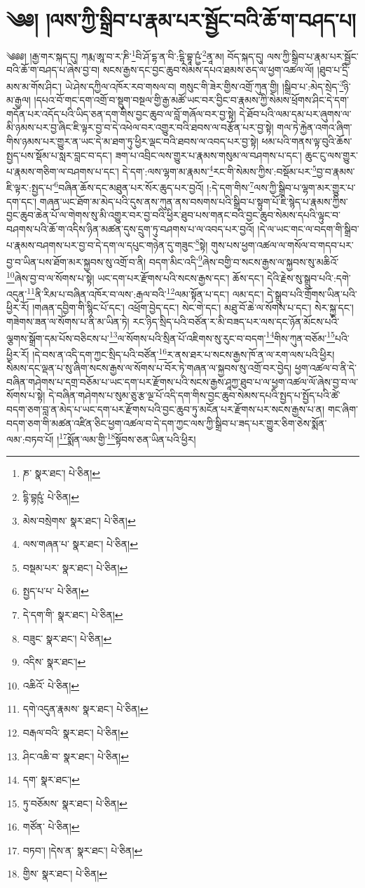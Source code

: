 \setcounter{footnote}{0} 
\chapter{༄༅། །ལས་ཀྱི་སྒྲིབ་པ་རྣམ་པར་སྦྱོང་བའི་ཆོ་ག་བཤད་པ།}༄༅༅། །རྒྱ་གར་སྐད་དུ། ཀརྨ་ཨཱ་བ་ར་ཎི་\footnote{ཎ་  སྣར་ཐང་།  པེ་ཅིན། }བི་ཤོ་དྷ་ན་བི་:དྷི་བྷཱ་ཥྱཾ་\footnote{དྷི་བྷཥུཾ་  པེ་ཅིན། }ནཱ་མ། བོད་སྐད་དུ། ལས་ཀྱི་སྒྲིབ་པ་རྣམ་པར་སྦྱོང་བའི་ཆོ་ག་བཤད་པ་ཞེས་བྱ་བ། སངས་རྒྱས་དང་བྱང་ཆུབ་སེམས་དཔའ་ཐམས་ཅད་ལ་ཕྱག་འཚལ་ལོ། །ཐུབ་པ་དྲི་མས་མ་གོས་ཤིང་། ཡེ་ཤེས་དཀྱིལ་འཁོར་རབ་གསལ་བ། གསུང་གི་ཟེར་གྱིས་འགྲོ་ཀུན་གྱི། །སྒྲིབ་པ་:མེད་སྲེད་\footnote{མེས་བསྲེགས་  སྣར་ཐང་།  པེ་ཅིན། }ཉི་མ་རྒྱལ། །དཔའ་བོ་གང་དག་འགྲོ་བ་སྡུག་བསྔལ་གྱི་རྒྱ་མཚོ་ཡང་བར་བྱིང་བ་རྣམས་ཀྱི་སེམས་ཕྲོགས་ཤིང་དེ་དག་གདོན་པར་འདོད་པའི་ཡིད་ཅན་དག་གིས་བྱང་ཆུབ་ལ་བློ་གཞོལ་བར་བྱ་སྟེ། དེ་ཐོབ་པའི་ལམ་དམ་པར་ཞུགས་ལ་མི་ཉམས་པར་བྱ་ཞིང་ཇི་ལྟར་བྱ་བ་དེ་འཕེལ་བར་འགྱུར་བའི་ཐབས་ལ་བརྩོན་པར་བྱ་སྟེ། གལ་ཏེ་རྐྱེན་འགའ་ཞིག་གིས་ཉམས་པར་གྱུར་ན་ཡང་དེ་མ་ཐག་ཏུ་ཕྱིར་ལྡང་བའི་ཐབས་ལ་འབད་པར་བྱ་སྟེ། ཕམ་པའི་གནས་ལྟ་བུའི་ཆོས་སྤྱད་པས་སྡོམ་པ་སླར་བླང་བ་དང་། ཟག་པ་འབྲིང་ལས་གྱུར་པ་རྣམས་གསུམ་ལ་བཤགས་པ་དང་། ཆུང་ངུ་ལས་གྱུར་པ་རྣམས་གཅིག་ལ་བཤགས་པ་དང་། དེ་དག་:ལས་ལྷག་མ་རྣམས་\footnote{ལས་གཞན་པ་  སྣར་ཐང་།  པེ་ཅིན། }རང་གི་སེམས་ཀྱིས་:བསྡོམ་པར་\footnote{བསྡམ་པར་  སྣར་ཐང་།  པེ་ཅིན། }བྱ་བ་རྣམས་ཇི་ལྟར་:སྤྱད་པ་\footnote{སྤྱད་པ་པ་  པེ་ཅིན། }བཞིན་ཆོས་དང་མཐུན་པར་སོར་ཆུད་པར་བྱའོ། །:དེ་དག་གིས་\footnote{དེ་དག་གི་  སྣར་ཐང་།  པེ་ཅིན། }ལས་ཀྱི་སྒྲིབ་པ་ལྷག་མར་གྱུར་པ་དག་དང་། གཞན་ཡང་ཐོག་མ་མེད་པའི་དུས་ནས་ཀུན་ནས་བསགས་པའི་སྒྲིབ་པ་སྟུག་པོ་ཇི་སྙེད་པ་རྣམས་ཀྱིས་བྱང་ཆུབ་ཆེན་པོ་ལ་གེགས་སུ་མི་འགྱུར་བར་བྱ་བའི་ཕྱིར་ཐུབ་པས་གནང་བའི་བྱང་ཆུབ་སེམས་དཔའི་ལྟུང་བ་བཤགས་པའི་ཆོ་ག་འདིས་ཉིན་མཚན་དུས་དྲུག་ཏུ་བཤགས་པ་ལ་འབད་པར་བྱའོ། །དེ་ལ་ཡང་གང་ལ་བདག་གི་སྒྲིབ་པ་རྣམས་བཤགས་པར་བྱ་བ་དེ་དག་ལ་དཔུང་གཉེན་དུ་གཟུང་\footnote{བཟུང་  སྣར་ཐང་།  པེ་ཅིན། }སྟེ། གུས་པས་ཕྱག་འཚལ་ལ་གསོལ་བ་གདབ་པར་བྱ་བ་ཡིན་པས་ཐོག་མར་སྐྱབས་སུ་འགྲོ་བ་ནི། བདག་མིང་འདི་\footnote{འདིས་  སྣར་ཐང་། }ཞེས་བགྱི་བ་སངས་རྒྱས་ལ་སྐྱབས་སུ་མཆིའོ་\footnote{འཆིའོ་  པེ་ཅིན། }ཞེས་བྱ་བ་ལ་སོགས་པ་སྟེ། ཡང་དག་པར་རྫོགས་པའི་སངས་རྒྱས་དང་། ཆོས་དང་། དེའི་རྗེས་སུ་སྒྲུབ་པའི་:དགེ་འདུན་\footnote{དགེ་འདུན་རྣམས་  སྣར་ཐང་།  པེ་ཅིན། }ནི་རིམ་པ་བཞིན་འཁོར་བ་ལས་:རྒལ་བའི་\footnote{བརྒལ་བའི་  སྣར་ཐང་།  པེ་ཅིན། }ལམ་སྟོན་པ་དང་། ལམ་དང་། དེ་སྒྲུབ་པའི་གྲོགས་ཡིན་པའི་ཕྱིར་རོ། །གཞན་དབྱིག་གི་སྙིང་པོ་དང་། འཕྲོག་བྱེད་དང་། སེང་གེ་དང་། མཐུ་བོ་ཆེ་ལ་སོགས་པ་དང་། སེར་སྐྱ་དང་། གཟེགས་ཟན་ལ་སོགས་པ་ནི་མ་ཡིན་ཏེ། རང་ཉིད་སྲིད་པའི་བཙོན་ར་མི་བཟད་པར་ལས་དང་ཉོན་མོངས་པའི་ལྕགས་སྒྲོག་དམ་པོས་བཅིངས་པ་\footnote{ཤིང་འཆི་བ་  སྣར་ཐང་།  པེ་ཅིན། }ལ་སོགས་པའི་སྲིན་པོ་འཇིགས་སུ་རུང་བ་བདག་\footnote{དག་  སྣར་ཐང་། }གིས་ཀུན་བཅོམ་\footnote{ཏུ་བཅོམས་  སྣར་ཐང་།  པེ་ཅིན། }པའི་ཕྱིར་རོ། །དེ་བས་ན་འདི་དག་ཀྱང་སྲིད་པའི་བཙོན་\footnote{གཙོན་  པེ་ཅིན། }ར་ནས་ཐར་པ་སངས་རྒྱས་ཁོ་ན་ལ་རག་ལས་པའི་ཕྱིར། སེམས་དང་ལྡན་པ་སུ་ཞིག་སངས་རྒྱས་ལ་སོགས་པ་བོར་ཏེ་གཞན་ལ་སྐྱབས་སུ་འགྲོ་བར་བྱེད། ཕྱག་འཚལ་བ་ནི་དེ་བཞིན་གཤེགས་པ་དགྲ་བཅོམ་པ་ཡང་དག་པར་རྫོགས་པའི་སངས་རྒྱས་ཤཱཀྱ་ཐུབ་པ་ལ་ཕྱག་འཚལ་ལོ་ཞེས་བྱ་བ་ལ་སོགས་པ་སྟེ། དེ་བཞིན་གཤེགས་པ་སུམ་ཅུ་རྩ་ལྔ་པོ་འདི་དག་གིས་བྱང་ཆུབ་སེམས་དཔའི་སྤྱད་པ་སྤྱོད་པའི་ཚེ་བདག་ཅག་བླ་ན་མེད་པ་ཡང་དག་པར་རྫོགས་པའི་བྱང་ཆུབ་ཏུ་མངོན་པར་རྫོགས་པར་སངས་རྒྱས་པ་ན། གང་ཞིག་བདག་ཅག་གི་མཚན་འཛིན་ཅིང་ཕྱག་འཚལ་བ་དེ་དག་ཀྱང་ལས་ཀྱི་སྒྲིབ་པ་ཟད་པར་གྱུར་ཅིག་ཅེས་སྨོན་ལམ་:བཏབ་པོ། །\footnote{བཏབ་། །དེས་ན་  སྣར་ཐང་།  པེ་ཅིན། }སྨོན་ལམ་གྱི་\footnote{གྱིས་  སྣར་ཐང་།  པེ་ཅིན། }སྟོབས་ཅན་ཡིན་པའི་ཕྱིར། 